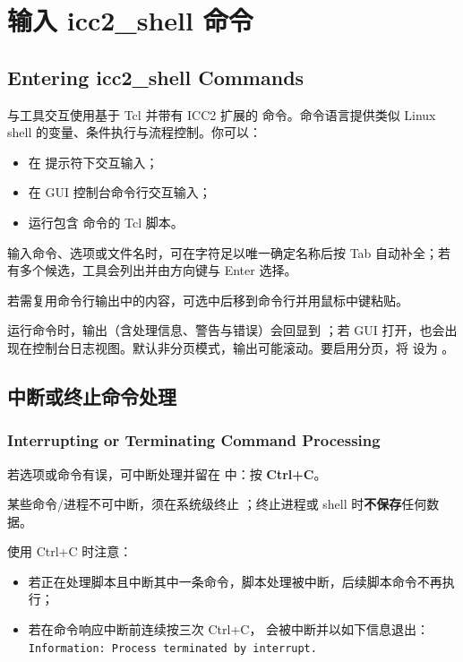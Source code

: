 \section{输入 icc2\_shell 命令}
\subsection*{Entering icc2\_shell Commands}

与工具交互使用基于 Tcl 并带有 ICC2 扩展的  命令。命令语言提供类似 Linux shell 的变量、条件执行与流程控制。你可以：
\begin{itemize}
  \item 在  提示符下交互输入；
  \item 在 GUI 控制台命令行交互输入；
  \item 运行包含  命令的 Tcl 脚本。
\end{itemize}

输入命令、选项或文件名时，可在字符足以唯一确定名称后按 Tab 自动补全；若有多个候选，工具会列出并由方向键与 Enter 选择。

若需复用命令行输出中的内容，可选中后移到命令行并用鼠标中键粘贴。

运行命令时，输出（含处理信息、警告与错误）会回显到 ；若 GUI 打开，也会出现在控制台日志视图。默认非分页模式，输出可能滚动。要启用分页，将  设为 。

\subsection{中断或终止命令处理}
\subsubsection*{Interrupting or Terminating Command Processing}

若选项或命令有误，可中断处理并留在  中：按 \textbf{Ctrl+C}。

某些命令/进程不可中断，须在系统级终止 ；终止进程或 shell 时\textbf{不保存}任何数据。

使用 Ctrl+C 时注意：
\begin{itemize}
  \item 若正在处理脚本且中断其中一条命令，脚本处理被中断，后续脚本命令不再执行；
  \item 若在命令响应中断前连续按三次 Ctrl+C， 会被中断并以如下信息退出：\\
        \texttt{Information: Process terminated by interrupt.}
\end{itemize}

